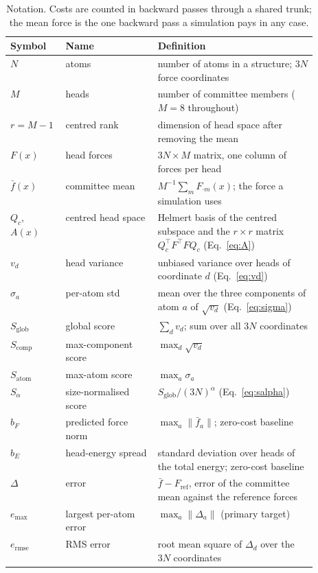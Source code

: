 \begin{table}[t]
\centering
\caption{Notation. Costs are counted in backward passes through a shared
trunk; the mean force is the one backward pass a simulation pays in any case.}
\label{tab:notation}
\small
\begin{tabular}{@{}llp{0.52\linewidth}@{}}
\toprule
Symbol & Name & Definition \\
\midrule
$N$ & atoms & number of atoms in a structure; $3N$ force coordinates \\
$M$ & heads & number of committee members ($M=8$ throughout) \\
$r=M-1$ & centred rank & dimension of head space after removing the mean \\
$F(x)$ & head forces & $3N\times M$ matrix, one column of forces per head \\
$\bar f(x)$ & committee mean & $M^{-1}\sum_m F_{\cdot m}(x)$; the force a simulation uses \\
$Q_c$, $A(x)$ & centred head space & Helmert basis of the centred subspace and the $r\times r$ matrix $Q_c^{\top}F^{\top}FQ_c$ (Eq.~\ref{eq:A}) \\
$v_d$ & head variance & unbiased variance over heads of coordinate $d$ (Eq.~\ref{eq:vd}) \\
$\sigma_a$ & per-atom std & mean over the three components of atom $a$ of $\sqrt{v_d}$ (Eq.~\ref{eq:sigma}) \\
$S_{\mathrm{glob}}$ & global score & $\sum_d v_d$; sum over all $3N$ coordinates \\
$S_{\mathrm{comp}}$ & max-component score & $\max_d\sqrt{v_d}$ \\
$S_{\mathrm{atom}}$ & max-atom score & $\max_a\sigma_a$ \\
$S_\alpha$ & size-normalised score & $S_{\mathrm{glob}}/(3N)^{\alpha}$ (Eq.~\ref{eq:salpha}) \\
$b_F$ & predicted force norm & $\max_a\lVert\bar f_a\rVert$; zero-cost baseline \\
$b_E$ & head-energy spread & standard deviation over heads of the total energy; zero-cost baseline \\
$\Delta$ & error & $\bar f-F_{\mathrm{ref}}$, error of the committee mean against the reference forces \\
$e_{\max}$ & largest per-atom error & $\max_a\lVert\Delta_a\rVert$ (primary target) \\
$e_{\mathrm{rmse}}$ & RMS error & root mean square of $\Delta_d$ over the $3N$ coordinates \\

\end{tabular}
\end{table}
